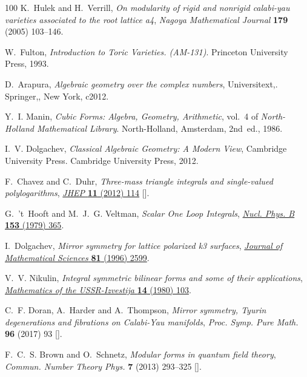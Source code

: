 \documentclass[12pt,a4paper]{article}
\theoremstyle{plain}
\theoremstyle{remark}
\begin{document}
\begin{thebibliography}{100}
K.~Hulek and H.~Verrill, \emph{On modularity of rigid and nonrigid calabi-yau
  varieties associated to the root lattice a4}, {\emph{Nagoya Mathematical
  Journal} {\bfseries 179} (2005) 103–146}.

W.~Fulton, \emph{Introduction to Toric Varieties. (AM-131)}. Princeton
  University Press, 1993.

D.~Arapura, \emph{Algebraic geometry over the complex numbers}, Universitext,.
  Springer,, New York, c2012.

Y.~I. Manin, \emph{Cubic Forms: Algebra, Geometry, Arithmetic}, vol.~4 of
  \emph{North-Holland Mathematical Library}. North-Holland, Amsterdam, 2nd~ed.,
  1986.

I.~V. Dolgachev, \emph{Classical Algebraic Geometry: A Modern View}, Cambridge
  University Press. Cambridge University Press, 2012.

F.~Chavez and C.~Duhr, \emph{{Three-mass triangle integrals and single-valued
  polylogarithms}}, \href{https://doi.org/10.1007/JHEP11(2012)114}{\emph{JHEP}
  {\bfseries 11} (2012) 114} [\href{https://arxiv.org/abs/1209.2722}{{}}].

G.~'t~Hooft and M.~J.~G. Veltman, \emph{{Scalar One Loop Integrals}},
  \href{https://doi.org/10.1016/0550-3213(79)90605-9}{\emph{Nucl. Phys. B}
  {\bfseries 153} (1979) 365}.

I.~Dolgachev, \emph{Mirror symmetry for lattice polarized k3 surfaces},
  \href{https://doi.org/10.1007/BF02362332}{\emph{Journal of Mathematical
  Sciences} {\bfseries 81} (1996) 2599}.

V.~V. Nikulin, \emph{Integral symmetric bilinear forms and some of their
  applications},
  \href{https://doi.org/10.1070/IM1980v014n01ABEH001060}{\emph{Mathematics of
  the USSR-Izvestija} {\bfseries 14} (1980) 103}.

C.~F. Doran, A.~Harder and A.~Thompson, \emph{{Mirror symmetry, Tyurin
  degenerations and fibrations on Calabi-Yau manifolds}}, {\emph{Proc. Symp.
  Pure Math.} {\bfseries 96} (2017) 93}
  [\href{https://arxiv.org/abs/1601.08110}{{}}].

F.~C.~S. Brown and O.~Schnetz, \emph{Modular forms in quantum field theory},
  {\emph{Commun. Number Theory Phys.} {\bfseries 7} (2013) 293–325}
  [\href{https://arxiv.org/abs/1304.5342}{{}}].


\end{thebibliography}
\end{document}
